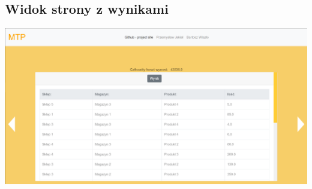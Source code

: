 \documentclass[11pt]{article}
\begin{document}
\subsection{Widok strony z wynikami}
\includegraphics[width=\textwidth,height=\textheight,keepaspectratio]{2.png}
\end{document}
